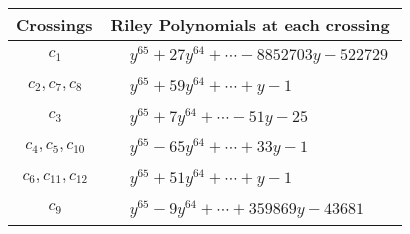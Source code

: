 \documentclass[1p]{elsarticle_modified}
\theoremstyle{definition}
\begin{document}
\begin{tabular}{m{50pt}|m{274pt}}
Crossings & \hspace{64pt}Riley Polynomials at each crossing \\
\hline $$\begin{aligned}c_{1}\end{aligned}$$&$\begin{aligned}
&y^{65}+27 y^{64}+\cdots-8852703 y-522729
\end{aligned}$\\
\hline $$\begin{aligned}c_{2},c_{7},c_{8}\end{aligned}$$&$\begin{aligned}
&y^{65}+59 y^{64}+\cdots+y-1
\end{aligned}$\\
\hline $$\begin{aligned}c_{3}\end{aligned}$$&$\begin{aligned}
&y^{65}+7 y^{64}+\cdots-51 y-25
\end{aligned}$\\
\hline $$\begin{aligned}c_{4},c_{5},c_{10}\end{aligned}$$&$\begin{aligned}
&y^{65}-65 y^{64}+\cdots+33 y-1
\end{aligned}$\\
\hline $$\begin{aligned}c_{6},c_{11},c_{12}\end{aligned}$$&$\begin{aligned}
&y^{65}+51 y^{64}+\cdots+y-1
\end{aligned}$\\
\hline $$\begin{aligned}c_{9}\end{aligned}$$&$\begin{aligned}
&y^{65}-9 y^{64}+\cdots+359869 y-43681
\end{aligned}$\\
\hline
\end{tabular}
\vskip 2pc
\end{document}
